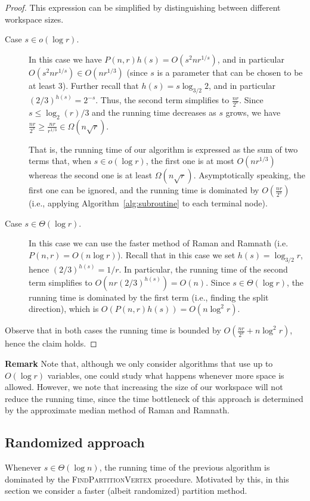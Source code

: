 \documentclass[a4paper]{article}
\begin{document}
\begin{proof}
This expression can be simplified by distinguishing between different workspace sizes. 

\begin{description}
\item[Case $s\in o(\log r)$.] In this case we have $P(n,r)h(s)=O(s^2nr^{1/s})$, and in particular $O(s^2nr^{1/s}) \in O(nr^{1/3})$ (since $s$ is a parameter that can be chosen to be at least 3). Further recall that $h(s)=s\log_{3/2}2$, and in particular  $(2/3)^{h(s)}=2^{-s}$. Thus, the second term simplifies to $\frac{nr}{2^s}$. 
Since $s\leq \log_2(r)/3$ and the running time decreases as $s$ grows, we have   $\frac{nr}{2^s} \geq \frac{nr}{r^{1/3}} \in \Omega(n\sqrt{r})$. 

That is, the running time of our algorithm is expressed as the sum of two terms that, when $s\in o(\log r)$, the first one is at most $O(nr^{1/3})$ whereas the second one is at least $\Omega(n\sqrt{r})$. Asymptotically speaking, the first one can be ignored, and the running time is dominated by $O(\frac{nr}{2^s})$ (i.e., applying Algorithm~\ref{alg:subroutine} to each terminal node). 
\item[Case $s\in\Theta(\log r)$.] In this case we can use the faster method of Raman and Ramnath (i.e. $P(n,r)=O(n\log r)$). Recall that in this case we set $h(s)=\log_{3/2}r$, hence  $(2/3)^{h(s)}=1/r$. In particular, the running time of the second term simplifies to $O(nr(2/3)^{h(s)})= 
O(n)$. Since  $s\in\Theta(\log r)$, the running time is dominated by the first term (i.e., finding the split direction), which is $O(P(n,r)h(s))=O(n\log^2 r)$. 
\end{description}
Observe that in both cases the running time is bounded by $O(\frac{nr}{2^{s}}+n\log^2 r)$, hence the claim holds. 
\end{proof}

{\bf Remark} Note that, although we only consider algorithms that use up to $O(\log r)$ variables, one could study what happens whenever more space is allowed. However, we note that increasing the size of our workspace will not reduce the running time, since the time bottleneck of this approach is determined by the approximate median method of Raman and Ramnath. 





\subsection{Randomized approach}\label{second}
Whenever $s\in \Theta (\log n)$, the running time of the previous algorithm is dominated by the \textsc{FindPartitionVertex} procedure. Motivated by this, in this section we consider a faster (albeit randomized) partition method. 
\end{document}
